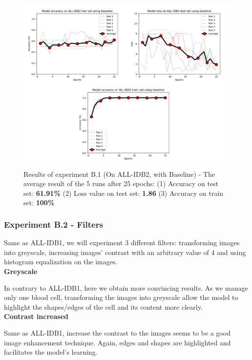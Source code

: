 \documentclass[11pt, openany]{report}
\theoremstyle{plain}
\theoremstyle{definition}
\theoremstyle{remark}
\begin{document}
\begin{figure}[H]
  \centering
  \includegraphics[scale=0.42]{Code/ch6-LeukemiaSubtypes/figures_result/ALL_IDB2/all_idb2-baseline.PNG}
  \caption{Results of experiment B.1 (On ALL-IDB2, with Baseline) - The average result of the 5 runs after 25 epochs: (1) Accuracy on test set: \textbf{61.91\%} (2) Loss value on test set: \textbf{1.86} (3) Accuracy on train set: \textbf{100\%}}
  \label{fig:results-B1}
\end{figure}

\subsubsection{Experiment B.2 - Filters}
Same as ALL-IDB1, we will experiment 3 different filters: transforming images into greyscale, increasing images' contrast with an arbitrary value of 4 and using histogram equalization on the images. \\

\textbf{Greyscale}

In contrary to ALL-IDB1, here we obtain more convincing results. As we manage only one blood cell, transforming the images into greyscale allow the model to highlight the shapes/edges of the cell and its content more clearly. \\ 

\textbf{Contrast increased}

Same as ALL-IDB1, increase the contrast to the images seems to be a good image enhancement technique. Again, edges and shapes are highlighted and facilitates the model's learning. \\ 
\end{document}
